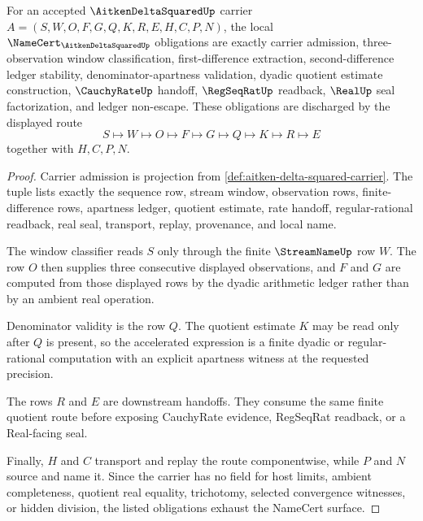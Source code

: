 \begin{theorem}
\label{thm:aitken-delta-squared-namecert-obligations}
For an accepted $\AitkenDeltaSquaredUp$ carrier $A=(S,W,O,F,G,Q,K,R,E,H,C,P,N)$, the local $\NameCert_{\AitkenDeltaSquaredUp}$ obligations are exactly carrier admission, three-observation window classification, first-difference extraction, second-difference ledger stability, denominator-apartness validation, dyadic quotient estimate construction, $\CauchyRateUp$ handoff, $\RegSeqRatUp$ readback, $\RealUp$ seal factorization, and ledger non-escape. These obligations are discharged by the displayed route
$$
S\longmapsto W\longmapsto O\longmapsto F\longmapsto G\longmapsto Q\longmapsto K\longmapsto R\longmapsto E
$$
together with $H,C,P,N$.
\end{theorem}
\begin{proof}
Carrier admission is projection from \autoref{def:aitken-delta-squared-carrier}. The tuple lists exactly the sequence row, stream window, observation rows, finite-difference rows, apartness ledger, quotient estimate, rate handoff, regular-rational readback, real seal, transport, replay, provenance, and local name.

The window classifier reads $S$ only through the finite $\StreamNameUp$ row $W$. The row $O$ then supplies three consecutive displayed observations, and $F$ and $G$ are computed from those displayed rows by the dyadic arithmetic ledger rather than by an ambient real operation.

Denominator validity is the row $Q$. The quotient estimate $K$ may be read only after $Q$ is present, so the accelerated expression is a finite dyadic or regular-rational computation with an explicit apartness witness at the requested precision.

The rows $R$ and $E$ are downstream handoffs. They consume the same finite quotient route before exposing CauchyRate evidence, RegSeqRat readback, or a Real-facing seal.

Finally, $H$ and $C$ transport and replay the route componentwise, while $P$ and $N$ source and name it. Since the carrier has no field for host limits, ambient completeness, quotient real equality, trichotomy, selected convergence witnesses, or hidden division, the listed obligations exhaust the NameCert surface.
\end{proof}

